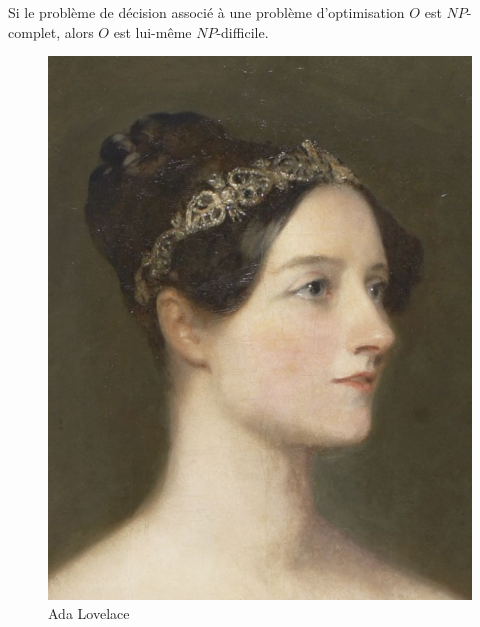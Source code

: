 \documentclass[a4paper,10pt,twocolumn]{article}
\begin{document}
		\begin{defn}
		Si le problème de décision associé à une problème d'optimisation $O$ est $NP$-complet, alors $O$ est lui-même $NP$-difficile.
		\end{defn}
		
		\vspace{3cm}
		\begin{figure}[htp]
		\centering
		\includegraphics[scale=0.90]{Ada-Lovelace.png}
		\caption{Ada Lovelace}
		\label{}
		\end{figure}
\end{document}
